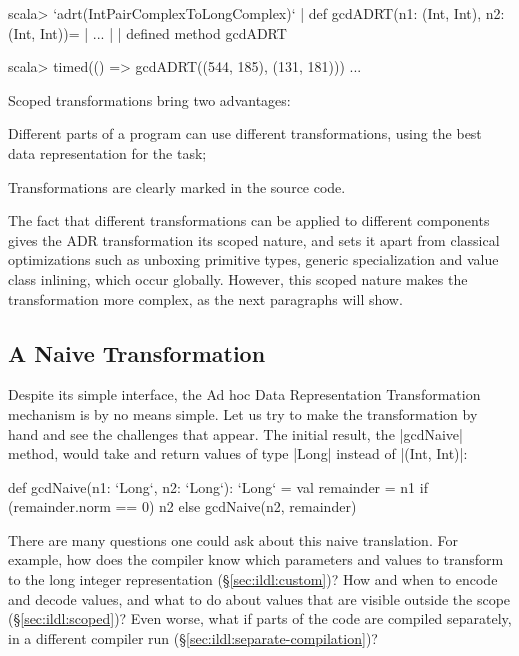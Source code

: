 \begin{lstlisting-nobreak}
scala> `adrt(IntPairComplexToLongComplex)` {
       |   def gcdADRT(n1: (Int, Int), n2: (Int, Int))={
       |     ...
       |   }
       | }
defined method gcdADRT

scala> timed(() => gcdADRT((544, 185), (131, 181)))
...
\end{lstlisting-nobreak}

Scoped transformations bring two advantages:

\vspace{0.25em}
\begin{compactitem}
 \item Different parts of a program can use different transformations, using the best data representation for the task;
 \item Transformations are clearly marked in the source code.
\end{compactitem}
\vspace{0.25em}

The fact that different transformations can be applied to different components gives the ADR transformation its scoped nature, and sets it apart from classical optimizations such as unboxing primitive types, generic specialization and value class inlining, which occur globally. However, this scoped nature makes the transformation more complex, as the next paragraphs will show.

\subsection{A Naive Transformation}

Despite its simple interface, the Ad hoc Data Representation Transformation mechanism is by no means simple. Let us try to make the transformation by hand and see the challenges that appear. The initial result, the |gcdNaive| method, would take and return values of type |Long| instead of |(Int, Int)|:

\begin{lstlisting-nobreak}
def gcdNaive(n1: `Long`, n2: `Long`): `Long` = {
  val remainder = n1 %
  if (remainder.norm == 0) n2 else gcdNaive(n2, remainder)
}
\end{lstlisting-nobreak}

There are many questions one could ask about this naive translation. For example, how does the compiler know which parameters and values to transform to the long integer representation (\S\ref{sec:ildl:custom})? How and when to encode and decode values, and what to do about values that are visible outside the scope (\S\ref{sec:ildl:scoped})? Even worse, what if parts of the code are compiled separately, in a different compiler run (\S\ref{sec:ildl:separate-compilation})?

